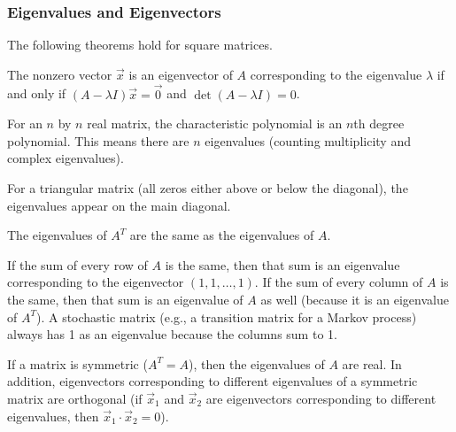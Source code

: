 \subsubsection{Eigenvalues and Eigenvectors}
The following theorems hold for square matrices.

\begin{theorem} \label{thm compute eigen}
The nonzero vector $\vec x$ is an eigenvector of $A$ corresponding to the eigenvalue $\lambda$ if and only if $(A-\lambda I)\vec x=\vec 0$ and $\det(A-\lambda I)=0$.
\end{theorem}

\begin{theorem}\label{thm characteristic degree n}
For an $n$ by $n$ real matrix, the characteristic polynomial is an $n$th degree polynomial. This means there are $n$ eigenvalues (counting multiplicity and complex eigenvalues). 
\end{theorem}

\begin{theorem}\label{thm eigen triangular}
For a triangular matrix (all zeros either above or below the diagonal), the eigenvalues appear on the main diagonal.
\end{theorem}

\begin{theorem}\label{thm eigen transpose}
The eigenvalues of $A^T$ are the same as the eigenvalues of $A$. 
\end{theorem}

\begin{theorem}\label{thm eigenvalues and sums}
If the sum of every row of $A$ is the same, then that sum is an eigenvalue corresponding to the eigenvector $(1,1,\ldots,1)$. 
If the sum of every column of $A$ is the same, then that sum is an eigenvalue of $A$ as well (because it is an eigenvalue of $A^T$). 
A stochastic matrix (e.g., a transition matrix for a Markov process) always has 1 as an eigenvalue because the columns sum to 1. 
\end{theorem}

\begin{theorem}\label{thm spectral}
If a matrix is symmetric ($A^T=A$), then the eigenvalues of $A$ are real. In addition, eigenvectors corresponding to different eigenvalues of a symmetric matrix are orthogonal (if $\vec x_1$ and $\vec x_2$ are eigenvectors corresponding to different eigenvalues, then $\vec x_1\cdot \vec x_2=0$).  
\end{theorem}

